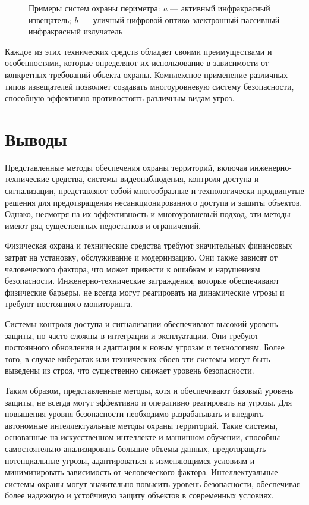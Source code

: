 \begin{figure}[!htbp]
\begin{subfigure}[t]{\dimexpr.5\linewidth-1.3em\relax}
	\end{subfigure}
\captionsetup{justification=centering} %
	\caption{Примеры систем охраны периметра: {\itshape a} --- активный инфракрасный извещатель; {\itshape b}~--- уличный цифровой оптико-электронный пассивный инфракрасный излучатель}\label{fig:two_izvesh} 
\end{figure}

Каждое из этих технических средств обладает своими преимуществами и особенностями, которые определяют их использование в зависимости от конкретных требований объекта охраны. Комплексное применение различных типов извещателей позволяет создавать многоуровневую систему безопасности, способную эффективно противостоять различным видам угроз.


\section{Выводы} \label{ch1:conclusion}
Представленные методы обеспечения охраны территорий, включая инженерно-технические средства, системы видеонаблюдения, контроля доступа и сигнализации, представляют собой многообразные и технологически продвинутые решения для предотвращения несанкционированного доступа и защиты объектов. Однако, несмотря на их эффективность и многоуровневый подход, эти методы имеют ряд существенных недостатков и ограничений.

Физическая охрана и технические средства требуют значительных финансовых затрат на установку, обслуживание и модернизацию. Они также зависят от человеческого фактора, что может привести к ошибкам и нарушениям безопасности. Инженерно-технические заграждения, которые обеспечивают физические барьеры, не всегда могут реагировать на динамические угрозы и требуют постоянного мониторинга.

Системы контроля доступа и сигнализации обеспечивают высокий уровень защиты, но часто сложны в интеграции и эксплуатации. Они требуют постоянного обновления и адаптации к новым угрозам и технологиям. Более того, в случае кибератак или технических сбоев эти системы могут быть выведены из строя, что существенно снижает уровень безопасности.

Таким образом, представленные методы, хотя и обеспечивают базовый уровень защиты, не всегда могут эффективно и оперативно реагировать на угрозы. Для повышения уровня безопасности необходимо разрабатывать и внедрять автономные интеллектуальные методы охраны территорий. Такие системы, основанные на искусственном интеллекте и машинном обучении, способны самостоятельно анализировать большие объемы данных, предотвращать потенциальные угрозы, адаптироваться к изменяющимся условиям и минимизировать зависимость от человеческого фактора. Интеллектуальные системы охраны могут значительно повысить уровень безопасности, обеспечивая более надежную и устойчивую защиту объектов в современных условиях.

